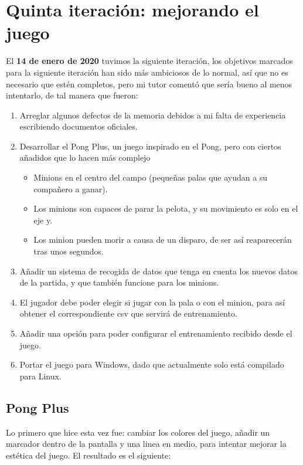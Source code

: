 \section{Quinta iteración: mejorando el juego}
El \textbf{14 de enero de 2020} tuvimos la siguiente iteración, los objetivos marcados para la siguiente iteración han sido más ambiciosos de lo normal, así que no es necesario que estén completos, pero mi tutor comentó que sería bueno al menos intentarlo, de tal manera que fueron:
\begin{enumerate}
	\item Arreglar algunos defectos de la memoria debidos a mi falta de experiencia escribiendo documentos oficiales.
	\item Desarrollar el Pong Plus, un juego inspirado en el Pong, pero con ciertos añadidos que lo hacen más complejo
	\begin{itemize}
		\item Minions en el centro del campo (pequeñas palas que ayudan a su compañero a ganar).
		\item Los minions son capaces de parar la pelota, y su movimiento es solo en el eje y.
		\item Los minion pueden morir a causa de un disparo, de ser así reaparecerán tras unos segundos.
	\end{itemize}
	\item Añadir un sistema de recogida de datos que tenga en cuenta los nuevos datos de la partida, y que también funcione para los minions.
	\item El jugador debe poder elegir si jugar con la pala o con el minion, para así obtener el correspondiente \gls{csv} que servirá de entrenamiento.
	\item Añadir una opción para poder configurar el entrenamiento recibido desde el juego.
	\item Portar el juego para Windows, dado que actualmente solo está compilado para Linux.
\end{enumerate}

\subsection{Pong Plus}
Lo primero que hice esta vez fue: cambiar los colores del juego, añadir un marcador dentro de la pantalla y una linea en medio, para intentar mejorar la estética del juego. El resultado es el siguiente:

